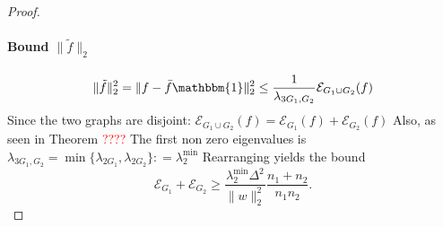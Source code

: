 \documentclass[11pt]{article}\usepackage{amsmath,amssymb,amsthm,bbm}
\newcommand{\EE}{\mathcal{E}}
\newcommand{\1}{\mathbbm{1}}
\begin{document}
\begin{proof}
\paragraph{Bound \( \|\tilde{f} \|_2\) }
\[  \|\tilde{f} \|^2_2  =   \|f - \bar{f} \1 \|^2_2 \leq \frac{1}{\lambda_{3 G_1,G_2}} \EE_{G_1 \cup G_2}(f)  \]
Since the two graphs are disjoint: \( \EE_{G_1 \cup G_2}(f) = \EE_{G_1}(f) + \EE_{G_2}(f)   \)
Also, as seen in Theorem \textcolor{red}{????} The first non zero eigenvalues is 
$\lambda_{3 G_1,G_2} = \operatorname{min} \{ \lambda_{2 G_1} , \lambda_{2 G_2}\}: = \lambda_2^{\operatorname{min}}$
Rearranging yields the bound\begin{equation}\displaystyle\EE_{G_1}+\EE_{G_2}\ge \frac{ \lambda_2^{\operatorname{min}} \Delta^{2}}{\|w \|^2_2}  \frac{n_1 + n_2 }{n_1 n_2}.\end{equation}
\end{proof}




\end{document}
